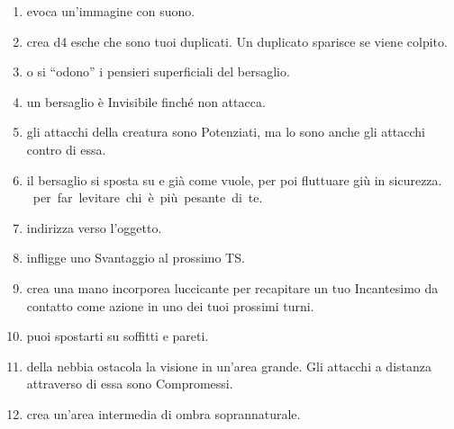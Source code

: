\documentclass[itdr]{subfiles}
\begin{document}
\begin{enumerate}
	\item {} evoca un'immagine con suono.
	\item {} crea d4 esche che sono tuoi duplicati. Un duplicato sparisce se viene colpito.
	\item {}  o si \mbox{``odono''} i pensieri superficiali del bersaglio.
	\item {} un bersaglio è Invisibile finché non attacca.
	\item {} gli attacchi della creatura sono Potenziati, ma lo sono anche gli attacchi contro di essa.
	\item {} il bersaglio si sposta su e già come vuole, per poi fluttuare giù in sicurezza. \mbox{ per far levitare chi è più pesante di te}.
	\item {} indirizza verso l'oggetto.
	\item {} infligge uno Svantaggio al prossimo TS.
	\item {} crea una mano incorporea luccicante per recapitare un tuo Incantesimo da contatto come azione in uno dei tuoi prossimi turni.
	\item {} puoi spostarti su soffitti e pareti.
	\item {} della nebbia ostacola la visione in un'area grande. Gli attacchi a distanza attraverso di essa sono Compromessi.
	\item {} crea un'area intermedia di ombra soprannaturale.

\vfill
\break


\end{enumerate}
\end{document}
